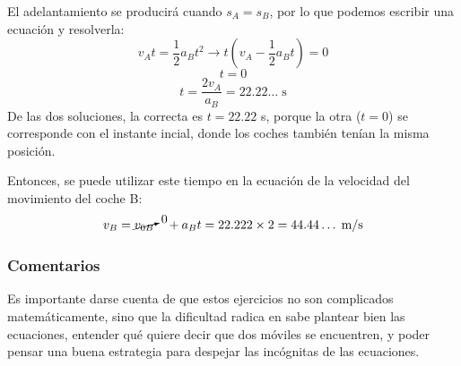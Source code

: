 \documentclass[ %
    oneside,    %
    10pt        %
]{apuntes} %
\begin{document}
\begin{examplebox}
	El adelantamiento se producirá cuando $s_A = s_B$, por lo que podemos escribir una ecuación y resolverla:
	\[ v_A t = \frac1{2}a_B t^2 \to t(v_A - \frac1{2}a_B t) = 0 \]
	\[t = 0\]
	\[t = \frac{2v_A}{a_B} = 22.22\dots \;\text{s}\]
	De las dos soluciones, la correcta es $t = 22.22$ s, porque la otra ($t = 0$) se corresponde con el instante incial, donde los coches también tenían la misma posición.
	\par Entonces, se puede utilizar este tiempo en la ecuación de la velocidad del movimiento del coche B:
	\[v_B = \cancelto{0}{v_{0B}}\quad + a_B t = 22.222 \times 2 = 44.44\dots\;\text{m/s}\]

	\subsubsection*{Comentarios}
	Es importante darse cuenta de que estos ejercicios no son complicados matemáticamente, sino que la dificultad radica en sabe plantear bien las  ecuaciones, entender qué quiere decir que dos móviles se encuentren, y poder pensar una buena estrategia para despejar las incógnitas de las ecuaciones.
\end{examplebox}
\newpage
\listoftodos
\end{document}
